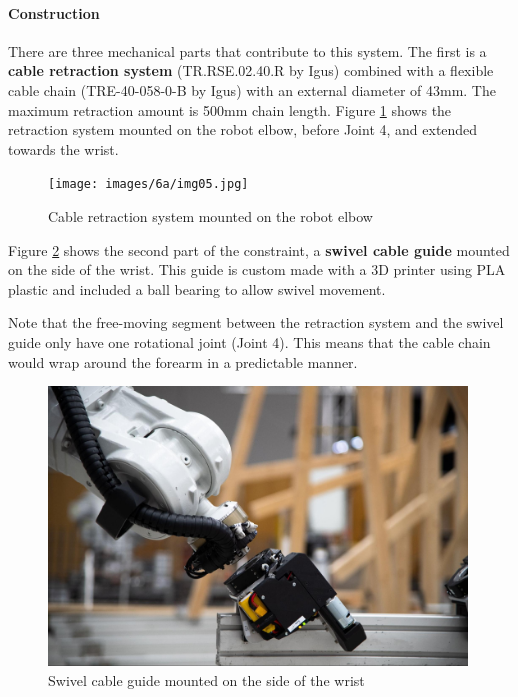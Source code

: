 \paragraph{Construction}

There are three mechanical parts that contribute to this system. The first is a \textbf{cable retraction system} (TR.RSE.02.40.R by Igus) combined with a flexible cable chain (TRE-40-058-0-B by Igus) with an external diameter of 43mm. The maximum retraction amount is 500mm chain length. Figure \ref{fig:cable-retraction-system} shows the retraction system mounted on the robot elbow, before Joint 4, and extended towards the wrist.

\begin{figure}[!h]
    \centering
    \texttt{[image: images/6a/img05.jpg]}
    \caption{Cable retraction system mounted on the robot elbow}
    \label{fig:cable-retraction-system}
\end{figure}

Figure \ref{fig:swivel-cable-guide} shows the second part of the constraint, a \textbf{swivel cable guide} mounted on the side of the wrist. This guide is custom made with a 3D printer using PLA plastic and included a ball bearing to allow swivel movement. 

Note that the free-moving segment between the retraction system and the swivel guide only have one rotational joint (Joint 4). This means that the cable chain would wrap around the forearm in a predictable manner. 

\begin{figure}[!h]
    \centering
    \includegraphics[width=0.99\textwidth]{images/6a/img06.jpg}
    \caption{Swivel cable guide mounted on the side of the wrist}
    \label{fig:swivel-cable-guide}
\end{figure}

